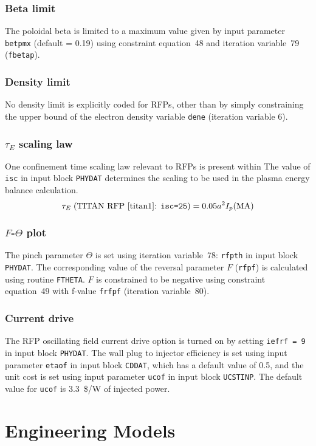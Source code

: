 \subsubsection{Beta limit}
The poloidal beta is limited to a maximum value given by input parameter
\texttt{betpmx} (default = 0.19) using constraint equation~48 and iteration
variable~79 (\texttt{fbetap}).

\subsubsection{Density limit}
No density limit is explicitly coded for RFPs, other than by simply
constraining the upper bound of the electron density variable \texttt{dene}
(iteration variable 6).

\subsubsection{$\tau_E$ scaling law}
One confinement time scaling law relevant to RFPs is present
within \PSD The value of {\tt isc} in input block {\tt PHYDAT} determines
the scaling to be used in the plasma energy balance calculation.
\[
\tau_E\; (\mbox{TITAN RFP~\cite{titan1}: {\tt isc=25}})
 = 0.05 a^2 I_p(\mathrm{MA})
\]

\subsubsection{$F$-$\Theta$ plot}
The pinch parameter $\Theta$ is set using iteration variable~78:
\texttt{rfpth} in input block \texttt{PHYDAT}. The corresponding value of the
reversal parameter $F$ (\texttt{rfpf}) is calculated using routine
\texttt{FTHETA}. $F$ is constrained to be negative using constraint
equation~49 with f-value \texttt{frfpf} (iteration variable~80).

\subsubsection{Current drive}
\label{sec:rfpcd}
The RFP oscillating field current drive option is turned on by setting
\texttt{iefrf = 9} in input block \texttt{PHYDAT}. The wall plug to injector
efficiency is set using input parameter \texttt{etaof} in input block
\texttt{CDDAT}, which has a default value of 0.5, and the unit cost is set
using input parameter \texttt{ucof} in input block \texttt{UCSTINP}. The
default value for \texttt{ucof} is 3.3~\$/W of injected power.

\section{Engineering Models}

